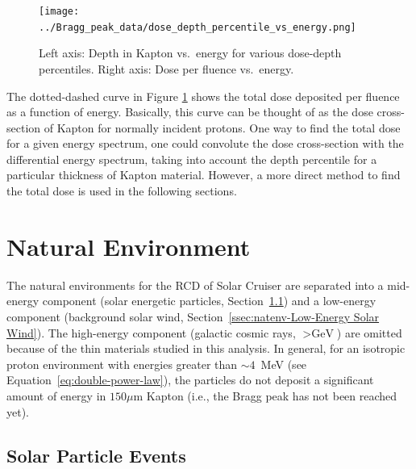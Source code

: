 \documentclass{hitec}
\begin{document}
\begin{figure}[htbp!]
	\centering
	\texttt{[image: ../Bragg\_peak\_data/dose\_depth\_percentile\_vs\_energy.png]}
	\caption{Left axis: Depth in Kapton vs.\ energy for various dose-depth percentiles. Right axis: Dose per fluence vs.\ energy.}\label{fig:dose_depth_percentile_vs_energy}
\end{figure}


The dotted-dashed curve in Figure \ref{fig:dose_depth_percentile_vs_energy} shows the total dose deposited per fluence as a function of energy. Basically, this curve can be thought of as the dose cross-section of Kapton for normally incident protons. One way to find the total dose for a given energy spectrum, one could convolute the dose cross-section with the differential energy spectrum, taking into account the depth percentile for a particular thickness of Kapton material. However, a more direct method to find the total dose is used in the following sections.

\section{Natural Environment}
\label{sec:Natural Environment}

The natural environments for the RCD of Solar Cruiser are separated into a mid-energy component (solar energetic particles, Section~\ref{ssec:natenv-Solar Particle Events}) and a low-energy component (background solar wind, Section~\ref{ssec:natenv-Low-Energy Solar Wind}). The high-energy component (galactic cosmic rays, $> \text{GeV}$) are omitted because of the thin materials studied in this analysis. In general, for an isotropic proton environment with energies greater than $\sim 4$~MeV (see Equation~\eqref{eq:double-power-law}), the particles do not deposit a significant amount of energy in $150 \mu$m Kapton (i.e., the Bragg peak has not been reached yet).


\subsection{Solar Particle Events}
\label{ssec:natenv-Solar Particle Events}
\end{document}
